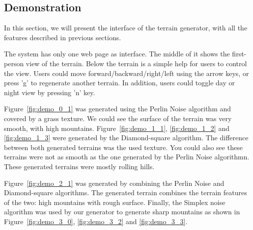 \subsection{Demonstration}
In this section, we will present the interface of the terrain generator, with all the features described in previous sections. 

The system has only one web page as interface. The middle of it shows the first-person view of the terrain. Below the terrain is a simple help for users to control the view. Users could move forward/backward/right/left using the arrow keys, or press 'g' to regenerate another terrain. In addition, users could toggle day or night view by pressing 'n' key. 

Figure~\ref{fig:demo_0_1} was generated using the Perlin Noise algorithm and covered by a grass texture. We could see the surface of the terrain was very smooth, with high mountains. Figure~\ref{fig:demo_1_1}, \ref{fig:demo_1_2} and \ref{fig:demo_1_3} were generated by the Diamond-square algorithm. The difference between both generated terrains was the used texture. You could also see these terrains were not as smooth as the one generated by the Perlin Noise algorithmn. These generated terrains were mostly rolling hills. 

Figure~\ref{fig:demo_2_1} was generated by combining the Perlin Noise and Diamond-square algorithms. The generated terrain combines the terrain features of the two: high mountains with rough surface. Finally, the Simplex noise algorithm was used by our generator to generate sharp mountains as shown in Figure~\ref{fig:demo_3_0}, \ref{fig:demo_3_2} and \ref{fig:demo_3_3}.

